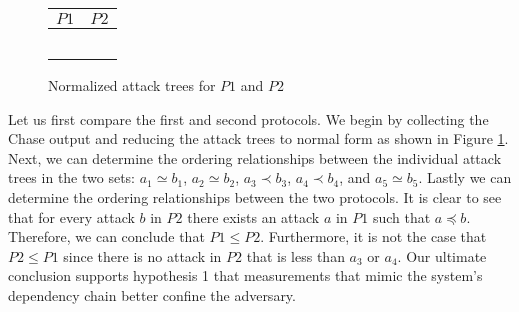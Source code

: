 \documentclass[runningheads]{llncs}
\theoremstyle{definition}
\begin{document}
\begin{figure}[h]
    \begin{center}
        \begin{tabular}{ M{6cm} | M{6cm} }
                $P1$ & $P2$ \\
                \hline
                &\\ 
                 \hspace{.03cm}  
                &  \hspace{.03cm}  \\ 
                &\\
                 \hspace{.03cm}  
                &    \\
                 
                 &  \\ 
            \end{tabular}
    \end{center}
    \caption{Normalized attack trees for $P1$ and $P2$}
    \label{fig:rtm-compare-reduced}
\end{figure}

Let us first compare the first and second protocols. We begin by
collecting the Chase output and reducing the attack trees to normal
form as shown in Figure \ref{fig:rtm-compare-reduced}. Next, we can
determine the ordering relationships between the individual attack
trees in the two sets: $a_1 \simeq b_1$, $a_2 \simeq b_2$, $a_3 \prec
b_3$, $a_4 \prec b_4$, and $a_5 \simeq b_5$. Lastly we can determine
the ordering relationships between the two protocols. It is clear to
see that for every attack $b$ in $P2$ there exists an attack $a$ in
$P1$ such that $a \preceq b$. Therefore, we can conclude that $P1 \leq
P2$. Furthermore, it is not the case that $P2 \leq P1$ since there is
no attack in $P2$ that is less than $a_3$ or $a_4$. Our ultimate
conclusion supports hypothesis 1 that measurements that mimic the
system's dependency chain better confine the adversary. 
\end{document}
